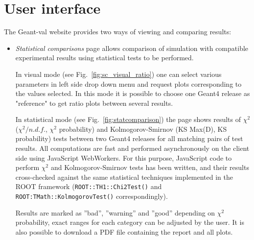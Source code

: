 \section{User interface}
\label{sec-analyse}

The \textsf{Geant-val} website provides two ways of viewing and comparing results:

\begin{itemize}



\item \textit{Statistical comparisons} page allows comparison of simulation with compatible experimental results using statistical tests to be performed. %

In visual mode  (see Fig.~\ref{fig:sc_visual_ratio}) one can select various parameters in left side drop down menu and request plots corresponding to the values selected. In this mode it is possible to choose one Geant4 release as "reference" to get ratio plots between several results.

In statistical mode (see Fig.~\ref{fig:statcomparison}) the page shows results of $\chi^2$ ($\chi^2/n.d.f.$, $\chi^2$ probability) and Kolmogorov-Smirnov (KS Max(D), KS probability) tests between two Geant4 releases for all matching pairs of test results.
All computations are fast and performed asynchronously on the client side using JavaScript WebWorkers. For this purpose, JavaScript code to perform $\chi^2$ and Kolmogorov-Smirnov tests has been written, and their results cross-checked against the same statistical techniques implemented in the ROOT framework ({\tt ROOT::TH1::Chi2Test()} and {\tt ROOT:TMath::KolmogorovTest()} correspondingly).

Results are marked as ''bad'', ''warning'' and ''good'' depending on $\chi^2$ probability, exact ranges for each category can be adjusted by the user. It is also possible to download a PDF file containing the report and all plots.


\end{itemize}

